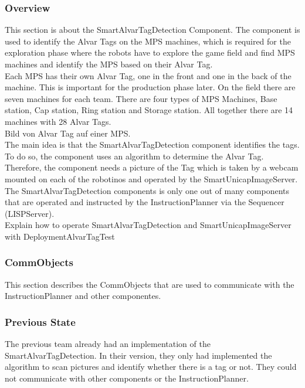 \subsubsection{Overview}


This section is about the SmartAlvarTagDetection Component. The component is used to identify the Alvar Tags on the MPS machines, which is required for the exploration phase where the robots have to explore the game field and find MPS machines and identify the MPS based on their Alvar Tag. \\

Each MPS has their own Alvar Tag, one in the front and one in the back of the machine. This is important for the production phase later. On the field there are seven machines for each team. There are four types of MPS Machines, Base station, Cap station, Ring station and Storage station. All together there are 14 machines with 28 Alvar Tags. \\
Bild von Alvar Tag auf einer MPS. \\

The main idea is that the SmartAlvarTagDetection component identifies the tags. To do so, the component uses an algorithm to determine the Alvar Tag. Therefore, the component needs a picture of the Tag which is taken by a webcam mounted on each of the robotinos and operated by the SmartUnicapImageServer. The SmartAlvarTagDetection components is only one out of many components that are operated and instructed by the InstructionPlanner via the Sequencer (LISPServer). \\
Explain how to operate SmartAlvarTagDetection and SmartUnicapImageServer with DeploymentAlvarTagTest

\subsubsection{CommObjects}

This section describes the CommObjects that are used to communicate with the InstructionPlanner and other componentes.

\subsubsection{Previous State}

The previous team already had an implementation of the SmartAlvarTagDetection. In their version, they only had implemented the algorithm to scan pictures and identify whether there is a tag or not. They could not communicate with other components or the InstructionPlanner. \\

